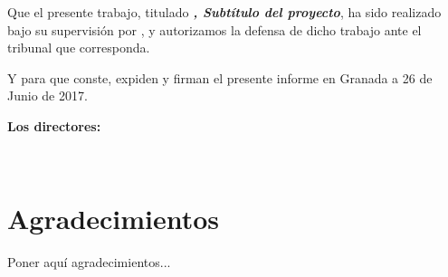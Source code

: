 Que el presente trabajo, titulado \textit{\textbf{\myTitle , Subtítulo del proyecto}},
ha sido realizado bajo su supervisión por \textbf{\myName}, y autorizamos la defensa de dicho trabajo ante el tribunal que corresponda.

\vspace{0.5cm}

Y para que conste, expiden y firman el presente informe en Granada a 26 de Junio de 2017.

\vspace{1cm}

\textbf{Los directores:}

\vspace{5cm}

\noindent \textbf{\myProf \ \ \ \ \ \myOtherProf}

\chapter*{Agradecimientos}
\thispagestyle{empty}

       \vspace{1cm}


Poner aquí agradecimientos...

